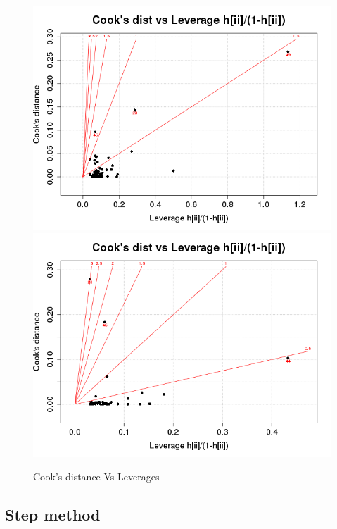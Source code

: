 \begin{figure}[p]
\begin{center}
    \includegraphics[scale=0.4]{imgOT/model1-drawCookVsLeverages.png}\hspace*{1cm}
	\includegraphics[scale=0.4]{imgOT/model2-drawCookVsLeverages.png}\\
  \end{center}
  \caption{Cook's distance Vs Leverages}
\end{figure}

\subsection{Step method}

